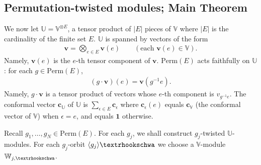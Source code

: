 \documentclass[12pt,a4paper,notitlepage]{article}
\theoremstyle{definition}
\theoremstyle{plain}
\newcommand{\id}{\mathbf{1}}
\newcommand{\bk}[1]{\langle {#1}\rangle}
\newcommand{\mbb}{\mathbb}
\newcommand{\Vbb}{\mathbb V}
\newcommand{\Ubb}{\mathbb U}
\newcommand{\Wbb}{\mathbb W}
\newcommand{\cbf}{\mathbf c}
\newcommand{\vbf}{\mathbf v}
\newcommand{\Perm}{\mathrm{Perm}}
\newcommand{\tipae}{\text{\textrhookschwa}}
\numberwithin{equation}{subsection}
\begin{document}
\subsection{Permutation-twisted modules; Main Theorem}\label{lb23}





We now let $\Ubb=\Vbb^{\otimes E}$, a tensor product of $|E|$ pieces of $\Vbb$ where $|E|$ is the cardinality of the finite set $E$.  $\Ubb$ is spanned by vectors of the form
\begin{align*}
\vbf=\bigotimes_{e\in E} \vbf(e)\qquad (\text{each }\vbf(e)\in\Vbb).	
\end{align*} 
Namely, $\vbf(e)$ is the $e$-th tensor component of $\vbf$. $\Perm(E)$ acts faithfully on $\Ubb$: for each $g\in\Perm(E)$,
\begin{align}
(g\cdot \vbf)(e)=\vbf(g^{-1}e).
\end{align}
Namely, $g\cdot \vbf$ is a tensor product of vectors whose $e$-th component is $v_{g^{-1}e}$. The conformal vector $\cbf_\Ubb$ of $\Ubb$ is $\sum_{\epsilon\in E}\cbf_\epsilon$ where $\cbf_\epsilon(e)$ equals $\cbf_\Vbb$ (the conformal vector of $\Vbb$) when $\epsilon=e$, and equals $\id$ otherwise.


Recall $g_1,\dots,g_N\in\Perm(E)$. For each $g_j$, we shall construct $g_j$-twisted $\mbb U$-modules. For each $g_j$-orbit $\bk{g_j}\tipae$ we choose a $\Vbb$-module $\Wbb_{j,\tipae}$.
\end{document}
